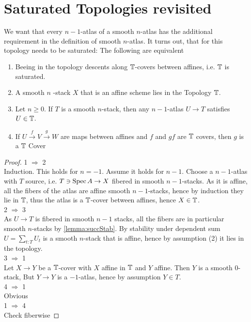 \documentclass{article}
\begin{document}

\section{Saturated Topologies revisited}

\begin{lemma}[1.1]{\label{lemma:smoothatlas}}
We want that every $n-1$-atlas of a smooth $n$-atlas has the additional requirement in the definition of smooth $n$-atlas. It turns out, that for this topology needs to be saturated:
The following are equivalent
\begin{enumerate}
   
    \item Beeing in the topology descents along $\mathbb{T}$-covers between affines, i.e. $\mathbb{T}$ is saturated.
    \item A smooth $n$ -stack $X$ that is an affine scheme lies in the Topology $\mathbb{T}$.  
    \item Let $n \ge 0$. If $T$ is a smooth $n$-stack, then any $n-1$-atlas $U \to T$ satisfies $U \in \mathbb{T}$.
     \item If $U \overset{f}{\to} V \overset{g}{\to} W$ are maps between affines and $f$ and $gf$ are $\mathbb{T}$ covers, then $g$ is a $\mathbb{T}$ Cover
\end{enumerate}
\end{lemma}
\begin{proof}
1 $\Rightarrow$ 2 \\
  Induction.
    This holds for $n=-1$. Assume it holds for $n-1$. Choose a $n-1$-atlas with $T$ source, i.e. $T \ni \operatorname{Spec} A \to X$ fibered in smooth $n-1$-stacks.  As it is affine, all the fibers of the atlas are affine smooth $n-1$-stacks, hence by induction they lie in $\mathbb{T}$, thus the atlas is a $\mathbb{T}$-cover between affines, hence $X \in \mathbb{T}$. \\
    2 $\Rightarrow$ 3 \\
    As $U \to T$ is fibered in smooth $n-1$ stacks, all the fibers are in particular smooth $n$-stacks by \ref{lemma:succStab}. By stability under dependent sum $U = \sum_{t : T} U_t$ is a smooth $n$-stack that is affine, hence by assumption (2) it lies in the topology.\\
3 $\Rightarrow$ 1 \\
Let $X \to Y$ be a $\mathbb{T}$-cover with $X$ affine in $\mathbb{T}$ and $Y$ affine. Then $Y$ is a smooth $0$-stack, But $Y \to Y$ is a $-1$-atlas, hence by assumption $Y \in T$. 
\\
4 $\Rightarrow$ 1 \\
Obvious
\\
1 $\Rightarrow$ 4 \\
Check fiberwise
\end{proof}
\end{document}
